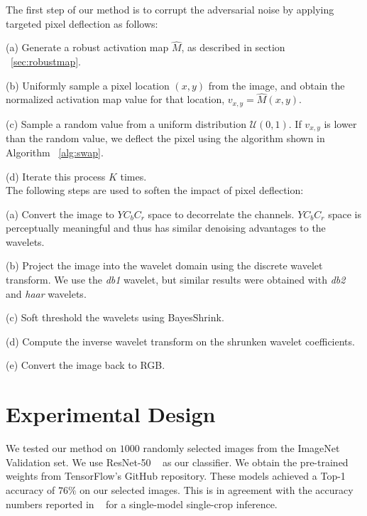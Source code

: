 The first step of our method is to corrupt the adversarial noise by applying targeted pixel deflection as follows: %

(a) Generate a robust activation map $\widehat{M}$, as described in section ~\ref{sec:robustmap}.

(b) Uniformly sample a pixel location $(x,y)$ from the image, and obtain the normalized activation map value for that location, $v_{x,y} = \widehat{M}(x,y)$.

(c) Sample a random value from a uniform distribution $\mathcal{U}(0,1)$. If $v_{x,y}$ is lower than the random value, we deflect the pixel using the algorithm shown in Algorithm  ~\ref{alg:swap}. 

(d) Iterate this process $K$ times. \\

The following steps are used to soften the impact of pixel deflection:

(a) Convert the image to $YC_bC_r$ space to decorrelate the channels. $YC_bC_r$ space is perceptually meaningful and thus has similar denoising advantages to the wavelets.  

(b) Project the image into the wavelet domain using the discrete wavelet transform. We use the \textit{db1} wavelet, but similar results were obtained with \textit{db2} and \textit{haar} wavelets. 

(c) Soft threshold the wavelets using BayesShrink. 

(d) Compute the inverse wavelet transform on the shrunken wavelet coefficients.

(e) Convert the image back to RGB.

\section{Experimental Design\label{sec:exp}}

We tested our method on $1000$ randomly selected images from the ImageNet ~\cite{Deng2009ImageNetAL} Validation set. 
We use ResNet-50 ~\cite{he2015deep} as our classifier. 
We obtain the pre-trained weights from TensorFlow's GitHub repository.
These models achieved a Top-1 accuracy of $76\%$ on our selected images. %
This is in agreement with the accuracy numbers reported in ~\cite{he2015deep} for a single-model single-crop inference.

